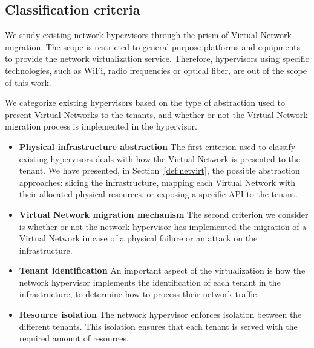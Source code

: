 \subsection{Classification criteria}
We study existing network hypervisors through the prism of Virtual Network migration.
The scope is restricted to general purpose platforms and equipments to provide the network virtualization service. Therefore, hypervisors using specific technologies, such as WiFi, radio frequencies or optical fiber, are out of the scope of this work.

We categorize existing hypervisors based on the type of abstraction used to present Virtual Networks to the tenants, and whether or not the Virtual Network migration process is implemented in the hypervisor.

\begin{itemize}
\item \textbf{Physical infrastructure abstraction}
The first criterion used to classify existing hypervisors deals with how the Virtual Network is presented to the tenant. We have presented, in Section~\ref{def:netvirt}, the possible abstraction approaches: slicing the infrastructure, mapping each Virtual Network with their allocated physical resources, or exposing a specific API to the tenant.

\item \textbf{Virtual Network migration mechanism}
The second criterion we consider is whether or not the network hypervisor has implemented the migration of a Virtual Network in case of a physical failure or an attack on the infrastructure.

\item \textbf{Tenant identification}
An important aspect of the virtualization is how the network hypervisor implements the identification of each tenant in the infrastructure, to determine how to process their network traffic.

\item \textbf{Resource isolation}
The network hypervisor enforces isolation between the different tenants.
This isolation ensures that each tenant is served with the required amount of resources.
\end{itemize}

